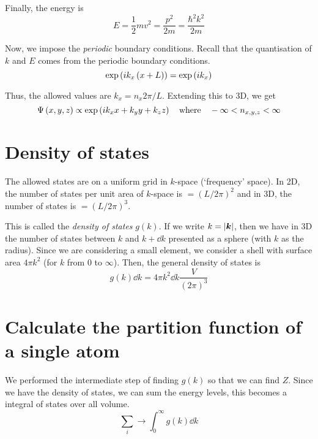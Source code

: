 \documentclass[12pt,chapterprefix=false,dvipsnames]{scrbook}
\theoremstyle{dotless}
\theoremstyle{definition}
\def\vec#1{{\ensuremath{\bm{{#1}}}}}
\begin{document}
Finally, the energy is
\begin{equation}
	E = \frac{1}{2}mv^2 = \frac{p^2}{2m} =
	\frac{\hbar^2 k^2}{2m}
\end{equation}

Now, we impose the \textit{periodic} boundary conditions.
Recall that the quantisation of $k$ and
$E$ comes from the periodic boundary
conditions.
\begin{equation}
	\exponential\left(i k_x \left(x+L\right)\right) =
	\exponential\left(ik_x\right)
\end{equation}

Thus, the allowed values are $k_x = n_x 2\pi / L$. Extending
this to 3D, we get
\begin{equation}
	\Psi\left(x,y,z\right)
	\propto
	\exponential\left(i k_x x + k_y y + k_z z\right)
	\hspace{1em}
	\mathrm{where}
	\hspace{1em}
	-\infty < n_{x,y,z} < \infty
\end{equation}

\section{Density of states}%
\label{sec:density_of_states}

The allowed states are on a uniform grid in
$k$-space (`frequency' space). In 2D, the
number of states per unit area of $k$-space
is $ = {\left( L/2\pi\right) }^2 $ and in 3D, the number of states is
$ = { \left( L/2\pi\right) }^3$.

This is called the \textit{density of states}
$g\left(k\right)$. If we write $k = \abs{ \vec{k}}$,
then we have in 3D the number of states between
$k$ and $k + \dd{k}$ presented as
a sphere (with $k$ as the radius). Since we
are considering a small element, we consider a shell with
surface area $4\pi k^2$ (for
$k$ from 0 to $\infty$).
Then, the general density of states is
\begin{equation}
	g\left(k\right)\dd{k} = 4\pi k^2
	\dd{k} \frac{V}{{\left(2\pi\right)}^3}
\end{equation}

\section{Calculate the partition function of a single atom}%
\label{sec:calculate_the_partition_function_of_a_single_atom}

We performed the intermediate step of finding
$g\left(k\right)$ so that we can find
$Z$. Since we have the density of states, we
can sum the energy levels, this becomes a integral of states
over all volume.
\begin{equation}
	\sum_i \rightarrow \int^\infty_0 g\left(k\right)
	\dd{k}
\end{equation}
\end{document}
